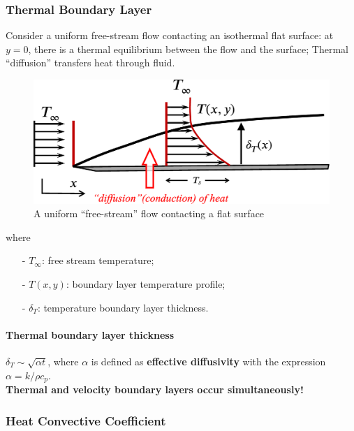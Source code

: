\documentclass[12pt, a4paper]{article}
\begin{document}
\subsubsection{Thermal Boundary Layer}
Consider a uniform free-stream flow contacting an isothermal flat surface: at $y=0$, there is a thermal equilibrium between the flow and the surface; Thermal “diffusion” transfers heat through fluid. 
\begin{figure}[H]
    \centering
    \includegraphics[width=.7\textwidth]{img/thermal_boundary_layer.eps}
    \caption{A uniform “free-stream” flow contacting a flat surface}
    \label{fig:thermal_BL}
\end{figure}
where 
\begin{itemize}
    \item[-] $T_\infty$: free stream temperature;
    \item[-] $T(x, y)$: boundary layer temperature profile;
    \item[-] $\delta_T$: temperature boundary layer thickness.
\end{itemize}

\paragraph{Thermal boundary layer thickness} $\delta_{T} \sim \sqrt{\alpha t}$, where $\alpha$ is defined as \textbf{effective diffusivity} with the expression $\alpha= k/\rho c_{p}$.\\

\textbf{Thermal and velocity boundary layers occur simultaneously!}

\subsubsection{Heat Convective Coefficient}
\end{document}
